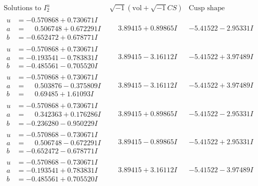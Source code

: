 \documentclass[1p]{elsarticle_modified}
\theoremstyle{definition}
\newcommand{\I}{\sqrt{-1}}
\begin{document}
$$\begin{array}{c|c|c}  
\text{Solutions to }I^u_{2}& \I (\text{vol} + \sqrt{-1}CS) & \text{Cusp shape}\\
 \hline 
\begin{aligned}
u &= -0.570868 + 0.730671 I \\
a &= \phantom{-}0.506748 + 0.672291 I \\
b &= -0.652472 + 0.678771 I\end{aligned}
 & \phantom{-}3.89415 + 0.89865 I & -5.41522 - 2.95331 I \\ \hline\begin{aligned}
u &= -0.570868 + 0.730671 I \\
a &= -0.193541 - 0.783831 I \\
b &= -0.485561 - 0.705520 I\end{aligned}
 & \phantom{-}3.89415 - 3.16112 I & -5.41522 + 3.97489 I \\ \hline\begin{aligned}
u &= -0.570868 + 0.730671 I \\
a &= \phantom{-}0.503876 - 0.375809 I \\
b &= \phantom{-}0.69485 + 1.61093 I\end{aligned}
 & \phantom{-}3.89415 - 3.16112 I & -5.41522 + 3.97489 I \\ \hline\begin{aligned}
u &= -0.570868 + 0.730671 I \\
a &= \phantom{-}0.342363 + 0.176286 I \\
b &= -0.236280 - 0.950229 I\end{aligned}
 & \phantom{-}3.89415 + 0.89865 I & -5.41522 - 2.95331 I \\ \hline\begin{aligned}
u &= -0.570868 - 0.730671 I \\
a &= \phantom{-}0.506748 - 0.672291 I \\
b &= -0.652472 - 0.678771 I\end{aligned}
 & \phantom{-}3.89415 - 0.89865 I & -5.41522 + 2.95331 I \\ \hline\begin{aligned}
u &= -0.570868 - 0.730671 I \\
a &= -0.193541 + 0.783831 I \\
b &= -0.485561 + 0.705520 I\end{aligned}
 & \phantom{-}3.89415 + 3.16112 I & -5.41522 - 3.97489 I \\ \hline\begin{aligned}

\end{aligned}
\end{array}$$
\end{document}
